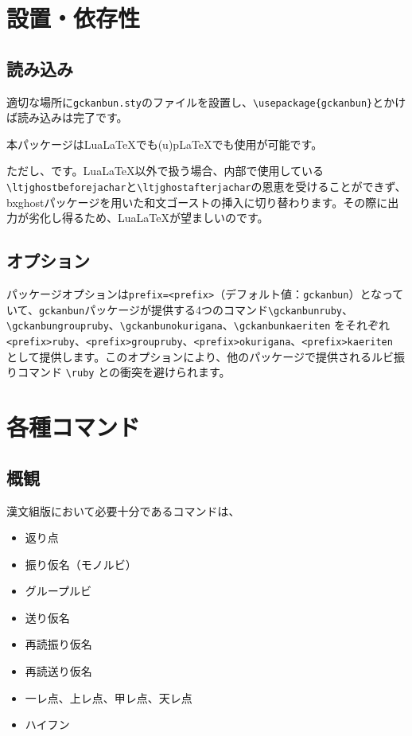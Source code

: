 \documentclass[luatex,fontsize=8pt,paper=b5,twoside]{jlreq}%
\begin{document}
\section{設置・依存性}
\subsection{読み込み}
適切な場所に\texttt{gckanbun.sty}のファイルを設置し、\verb|\usepackage{gckanbun}|とかけば読み込みは完了です。

本パッケージはLuaLaTeXでも(u)pLaTeXでも使用が可能です。

ただし、です。LuaLaTeX以外で扱う場合、内部で使用している\verb|\ltjghostbeforejachar|と\verb|\ltjghostafterjachar|の恩恵を受けることができず、bxghostパッケージを用いた和文ゴーストの挿入に切り替わります。その際に出力が劣化し得るため、LuaLaTeXが望ましいのです。

\subsection{オプション}
パッケージオプションは\verb|prefix=<prefix>|（デフォルト値：\verb|gckanbun|）となっていて、\texttt{gckanbun}パッケージが提供する4つのコマンド\verb|\gckanbunruby|、\verb|\gckanbungroupruby|、\verb|\gckanbunokurigana|、\verb|\gckanbunkaeriten| をそれぞれ\verb|<prefix>ruby|、\verb|<prefix>groupruby|、\verb|<prefix>okurigana|、\verb|<prefix>kaeriten| として提供します。このオプションにより、他のパッケージで提供されるルビ振りコマンド \verb|\ruby| との衝突を避けられます。


\section{各種コマンド}
\subsection{概観}
漢文組版において必要十分であるコマンドは、

\begin{itemize}
  \item 返り点
  \item 振り仮名（モノルビ）
  \item グループルビ
  \item 送り仮名
  \item 再読振り仮名
  \item 再読送り仮名
  \item 一レ点、上レ点、甲レ点、天レ点
  \item ハイフン
\end{itemize}
\end{document}
